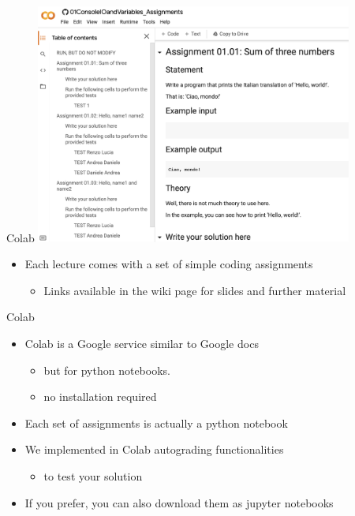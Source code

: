 \documentclass{beamer}%
\begin{document}
\begin{frame}{Colab}
	\centering 
	\includegraphics[width=0.78\textwidth]{figures/colab1}
	\begin{itemize}
		\item Each lecture comes with a set of simple coding assignments
		\begin{itemize}
			\item Links available in the wiki page for slides and further material
		\end{itemize}
	\end{itemize}
\end{frame}

\begin{frame}{Colab}
	\centering 
	\begin{itemize}
		\item Colab is a Google service similar to Google docs 
		\begin{itemize}
			\item but for python notebooks.
			\item no installation required
		\end{itemize}	
		\item Each set of assignments is actually a python notebook
		\item We implemented in Colab autograding functionalities
		\begin{itemize}
			\item to test your solution
		\end{itemize}	
		\item If you prefer, you can also download them as jupyter notebooks
	\end{itemize}
\end{frame}
\end{document}
